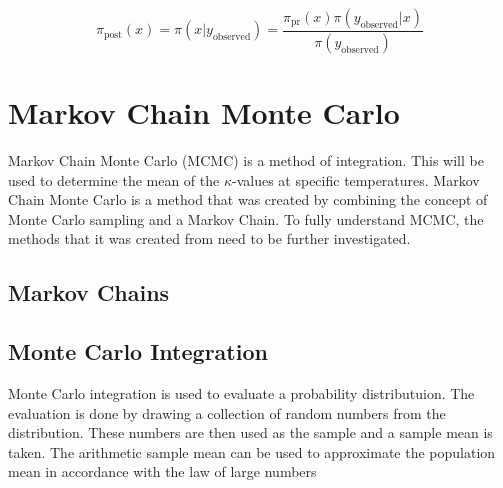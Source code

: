 	\begin{equation}
	\label{bayes_eq}
	\pi_{\text{post}}(x) = \pi(x|y_{\text{observed}}) = \frac{\pi_{\text{pr}}(x) \pi(y_{\text{observed}}|x)}{\pi (y_{\text{observed}})}	
	\end{equation}

\section{Markov Chain Monte Carlo} \label{MCMCdet}
Markov Chain Monte Carlo (MCMC) is a method of integration. This will be used to determine the mean of the $\kappa$-values at specific temperatures. 
	Markov Chain Monte Carlo is a method that was created by combining the concept of Monte Carlo sampling  and a Markov Chain. 
	To fully understand MCMC, the methods that it was created from need to be further investigated.
	\subsection{Markov Chains}
		
		
		
	\subsection{Monte Carlo Integration}
	Monte Carlo integration is used to evaluate a probability distributuion. 
	The evaluation is done by drawing a collection of random numbers from the distribution.
	These numbers are then used as the sample and a sample mean is taken.
	The arithmetic sample mean can be used to approximate the population mean in accordance with the law of large numbers \citep{Gilks:1996} 
